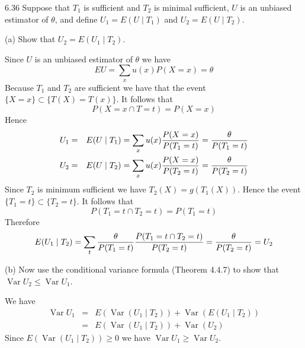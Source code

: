 \documentclass[12pt]{article}
\begin{document}
6.36
Suppose that $T_1$ is sufficient and $T_2$ is minimal sufficient,
$U$ is an unbiased estimator of $\theta$, and define
$U_1=E(U\mid T_1)$ and $U_2=E(U\mid T_2)$.

\bigskip
\noindent
(a) Show that $U_2=E(U_1\mid T_2)$.

\bigskip
\noindent
Since $U$ is an unbiased estimator of $\theta$ we have
$$EU=\sum_x u(x)P(X=x)=\theta$$
Because $T_1$ and $T_2$ are sufficient we have that the event
$\{X=x\}\subset\{T(X)=T(x)\}$.
It follows that
$$P(X=x\cap T=t)=P(X=x)$$
Hence
\begin{eqnarray*}
U_1&=&E(U\mid T_1)=\sum_x u(x){P(X=x)\over P(T_1=t)}={\theta\over P(T_1=t)}\\
U_2&=&E(U\mid T_2)=\sum_x u(x){P(X=x)\over P(T_2=t)}={\theta\over P(T_2=t)}
\end{eqnarray*}
Since $T_2$ is minimum sufficient we have $T_2(X)=g(T_1(X))$.
Hence the event $\{T_1=t\}\subset\{T_2=t\}$.
It follows that
$$P(T_1=t\cap T_2=t)=P(T_1=t)$$
Therefore
$$E(U_1\mid T_2)=\sum_t {\theta\over P(T_1=t)}
{P(T_1=t\cap T_2=t)\over P(T_2=t)}={\theta\over P(T_2=t)}=U_2
$$

\bigskip
\noindent
(b) Now use the conditional variance formula (Theorem 4.4.7)
to show that $\mathop{Var}U_2\le\mathop{Var}U_1$.

\bigskip
\noindent
We have
\begin{eqnarray*}
\mathop{Var}U_1&=&E(\mathop{Var}(U_1\mid T_2))+\mathop{Var}(E(U_1\mid T_2))\\
&=&E(\mathop{Var}(U_1\mid T_2))+\mathop{Var}(U_2)
\end{eqnarray*}
Since $E(\mathop{Var}(U_1\mid T_2))\ge0$ we have
$\mathop{Var}U_1\ge\mathop{Var}U_2$.
\end{document}
